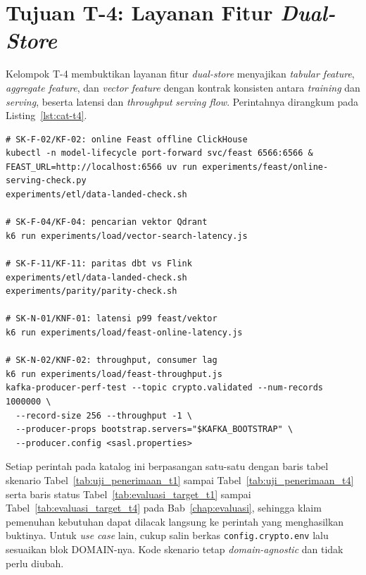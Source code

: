 \section{Tujuan T-4: Layanan Fitur \textit{Dual-Store}}
\label{sec:appx-t4}

Kelompok T-4 membuktikan layanan fitur \textit{dual-store} menyajikan \textit{tabular feature}, \textit{aggregate feature}, dan \textit{vector feature} dengan kontrak konsisten antara \textit{training} dan \textit{serving}, beserta latensi dan \textit{throughput} \textit{serving flow}. Perintahnya dirangkum pada Listing~\ref{lst:cat-t4}.

\begin{lstlisting}[caption={Perintah verifikasi tujuan T-4 (dari \texttt{\textasciitilde/documents/ta/})},label={lst:cat-t4},basicstyle=\ttfamily\footnotesize,breaklines=true,captionpos=t]
# SK-F-02/KF-02: online Feast offline ClickHouse
kubectl -n model-lifecycle port-forward svc/feast 6566:6566 &
FEAST_URL=http://localhost:6566 uv run experiments/feast/online-serving-check.py
experiments/etl/data-landed-check.sh

# SK-F-04/KF-04: pencarian vektor Qdrant
k6 run experiments/load/vector-search-latency.js

# SK-F-11/KF-11: paritas dbt vs Flink
experiments/etl/data-landed-check.sh
experiments/parity/parity-check.sh

# SK-N-01/KNF-01: latensi p99 feast/vektor
k6 run experiments/load/feast-online-latency.js

# SK-N-02/KNF-02: throughput, consumer lag
k6 run experiments/load/feast-throughput.js
kafka-producer-perf-test --topic crypto.validated --num-records 1000000 \
  --record-size 256 --throughput -1 \
  --producer-props bootstrap.servers="$KAFKA_BOOTSTRAP" \
  --producer.config <sasl.properties>
\end{lstlisting}

Setiap perintah pada katalog ini berpasangan satu-satu dengan baris tabel skenario Tabel~\ref{tab:uji_penerimaan_t1} sampai Tabel~\ref{tab:uji_penerimaan_t4} serta baris status Tabel~\ref{tab:evaluasi_target_t1} sampai Tabel~\ref{tab:evaluasi_target_t4} pada Bab~\ref{chap:evaluasi}, sehingga klaim pemenuhan kebutuhan dapat dilacak langsung ke perintah yang menghasilkan buktinya. Untuk \textit{use case} lain, cukup salin berkas \texttt{config.crypto.env} lalu sesuaikan blok DOMAIN-nya. Kode skenario tetap \textit{domain-agnostic} dan tidak perlu diubah.
